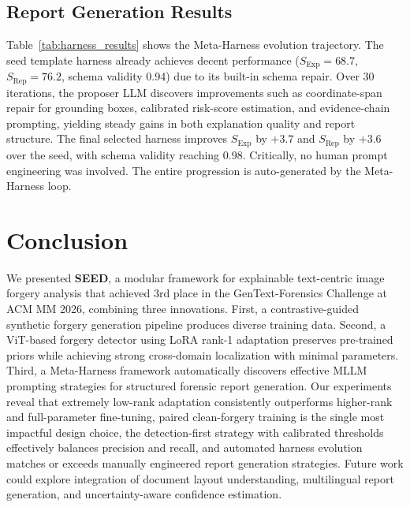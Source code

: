 \documentclass[sigconf, screen, review, anonymous]{acmart}
\begin{document}
\subsection{Report Generation Results}

Table~\ref{tab:harness_results} shows the Meta-Harness evolution trajectory. The seed template harness already achieves decent performance ($S_{\text{Exp}} = 68.7$, $S_{\text{Rep}} = 76.2$, schema validity 0.94) due to its built-in schema repair. Over 30 iterations, the proposer LLM discovers improvements such as coordinate-span repair for grounding boxes, calibrated risk-score estimation, and evidence-chain prompting, yielding steady gains in both explanation quality and report structure. The final selected harness improves $S_{\text{Exp}}$ by $+3.7$ and $S_{\text{Rep}}$ by $+3.6$ over the seed, with schema validity reaching 0.98. Critically, no human prompt engineering was involved. The entire progression is auto-generated by the Meta-Harness loop.

\section{Conclusion}

We presented \textbf{SEED}, a modular framework for explainable text-centric image forgery analysis that achieved 3rd place in the GenText-Forensics Challenge at ACM MM 2026, combining three innovations. First, a contrastive-guided synthetic forgery generation pipeline produces diverse training data. Second, a ViT-based forgery detector using LoRA rank-1 adaptation preserves pre-trained priors while achieving strong cross-domain localization with minimal parameters. Third, a Meta-Harness framework automatically discovers effective MLLM prompting strategies for structured forensic report generation. Our experiments reveal that extremely low-rank adaptation consistently outperforms higher-rank and full-parameter fine-tuning, paired clean-forgery training is the single most impactful design choice, the detection-first strategy with calibrated thresholds effectively balances precision and recall, and automated harness evolution matches or exceeds manually engineered report generation strategies. Future work could explore integration of document layout understanding, multilingual report generation, and uncertainty-aware confidence estimation.



\end{document}
